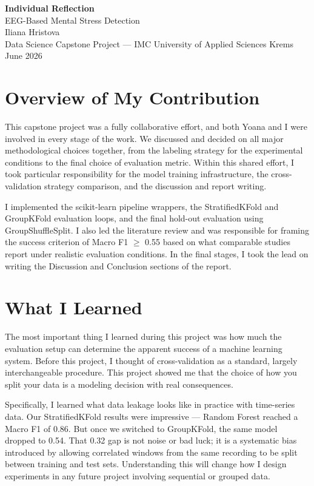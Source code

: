 \documentclass[12pt,a4paper]{article}
\begin{document}
\begin{center}
	{\Large \textbf{Individual Reflection}}\\[0.4em]
	{\large EEG-Based Mental Stress Detection}\\[0.3em]
	{\normalsize Iliana Hristova}\\[0.2em]
	{\normalsize Data Science Capstone Project --- IMC University of Applied Sciences Krems}\\[0.2em]
	{\normalsize June 2026}
\end{center}

\vspace{1em}

\section*{Overview of My Contribution}

This capstone project was a fully collaborative effort, and both Yoana and I were involved in every stage of the work. We discussed and decided on all major methodological choices together, from the labeling strategy for the experimental conditions to the final choice of evaluation metric. Within this shared effort, I took particular responsibility for the model training infrastructure, the cross-validation strategy comparison, and the discussion and report writing.

I implemented the scikit-learn pipeline wrappers, the StratifiedKFold and GroupKFold evaluation loops, and the final hold-out evaluation using GroupShuffleSplit. I also led the literature review and was responsible for framing the success criterion of Macro F1 $\geq$ 0.55 based on what comparable studies report under realistic evaluation conditions. In the final stages, I took the lead on writing the Discussion and Conclusion sections of the report.

\section*{What I Learned}

The most important thing I learned during this project was how much the evaluation setup can determine the apparent success of a machine learning system. Before this project, I thought of cross-validation as a standard, largely interchangeable procedure. This project showed me that the choice of how you split your data is a modeling decision with real consequences.

Specifically, I learned what data leakage looks like in practice with time-series data. Our StratifiedKFold results were impressive --- Random Forest reached a Macro F1 of 0.86. But once we switched to GroupKFold, the same model dropped to 0.54. That 0.32 gap is not noise or bad luck; it is a systematic bias introduced by allowing correlated windows from the same recording to be split between training and test sets. Understanding this will change how I design experiments in any future project involving sequential or grouped data.
\end{document}
